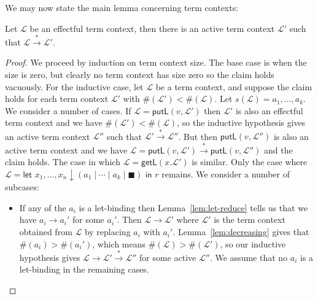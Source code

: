 \documentclass[twoside,11pt,final]{entics}
\newcommand{\getl}{\mathsf{getL}}
\newcommand{\putl}{\mathsf{putL}}
\newcommand{\asn}{\downarrow}
\newcommand{\seq}{,\!\ldots\!,}
\begin{document}
We may now state the main lemma concerning term contexts:
\begin{lemma}\label{lem:effectful-active}
  Let $\mathcal{L}$ be an effectful term context, then there is an active term context $\mathcal{L}'$ such that $\mathcal{L} \stackrel{*}{\to} \mathcal{L}'$.
\end{lemma}
\begin{proof}
  We proceed by induction on term context size. The base case is when the size is zero, but clearly no term context has size zero so the claim holds vacuously. For the inductive case, let $\mathcal{L}$ be a term context, and suppose the claim holds for each term context $\mathcal{L}'$ with $\#(\mathcal{L}') < \#(\mathcal{L})$. Let $s(\mathcal{L}) = a_1 \seq a_k$. We consider a number of cases. If $\mathcal{L} = \putl(v,\mathcal{L}')$ then $\mathcal{L}'$ is also an effectful term context and we have $\#(\mathcal{L}') < \#(\mathcal{L})$, so the inductive hypothesis gives an active term context $\mathcal{L}''$ such that $\mathcal{L}' \stackrel{*}{\to} \mathcal{L}''$. But then $\putl(v,\mathcal{L}'')$ is also an active term context and we have $\mathcal{L} = \putl(v,\mathcal{L}') \stackrel{*}{\to} \putl(v,\mathcal{L}'')$ and the claim holds. The case in which $\mathcal{L} = \getl(x.\mathcal{L}')$ is similar. Only the case where $\mathcal{L} = \textsf{let } x_1 \seq x_n \asn (a_1 \mid \cdots \mid a_k \mid \blacksquare) \textsf{ in } r$ remains. We consider a number of subcases:
  \begin{itemize}
  \item If any of the $a_i$ is a let-binding then Lemma~\ref{lem:let-reduce} tells us that we have $a_i \to a_i'$ for some $a_i'$. Then $\mathcal{L} \to \mathcal{L'}$ where $\mathcal{L'}$ is the term context obtained from $\mathcal{L}$ by replacing $a_i$ with $a_i'$. Lemma~\ref{lem:decreasing} gives that $\#(a_i) > \#(a_i')$, which means $\#(\mathcal{L}) > \#(\mathcal{L}')$, so our inductive hypothesis gives $\mathcal{L} \to \mathcal{L}' \stackrel{*}{\to} \mathcal{L}''$ for some active $\mathcal{L}''$. We assume that no $a_i$ is a let-binding in the remaining cases. 
    

\end{itemize}
\end{proof}
\end{document}
